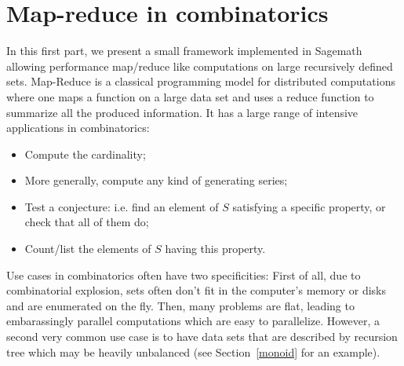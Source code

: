 \documentclass{deliverablereport}
\begin{document}
\section{Map-reduce in combinatorics}

In this first part, we present a small framework implemented in
Sagemath~\cite{sage} allowing performance map/reduce like computations on
large recursively defined sets. Map-Reduce is a classical programming model
for distributed computations where one maps a function on a large data set and
uses a reduce function to summarize all the produced information. It has a
large range of intensive applications in combinatorics:
\begin{itemize}
  \item Compute the cardinality;
  \item More generally, compute any kind of generating series;
  \item Test a conjecture: i.e. find an element of $S$ satisfying a specific
    property, or check that all of them do;
  \item Count/list the elements of $S$ having this property.
\end{itemize}
Use cases in combinatorics often have two specificities: First of all, due to
combinatorial explosion, sets often don't fit in the computer's memory or
disks and are enumerated on the fly. Then, many problems are flat, leading to
embarassingly parallel computations which are easy to parallelize. However, a
second very common use case is to have data sets that are described by
recursion tree which may be heavily unbalanced (see Section~\ref{monoid} for
an example).
\end{document}
